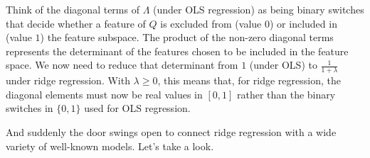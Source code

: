\documentclass[11pt]{article}
\begin{document}
	Think of the diagonal terms of $\Lambda$ (under OLS regression) as being binary switches that decide whether a feature of $Q$ is excluded from (value $0$) or included in (value $1$) the feature subspace. The product of the non-zero diagonal terms represents the determinant of the features chosen to be included in the feature space. We now need to reduce that determinant from $1$ (under OLS) to $\frac{1}{1 + \lambda}$ under ridge regression. With $\lambda \geq 0$, this means that, for ridge regression, the diagonal elements must now be real values in $[0, 1]$ rather than the binary switches in $\{0, 1\}$ used for OLS regression.
	
	And suddenly the door swings open to connect ridge regression with a wide variety of well-known models. Let's take a look.
	
%	
%	
%
	
	
	
\end{document}
